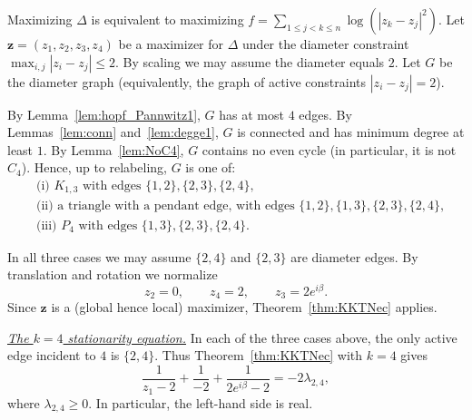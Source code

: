 \documentclass{article}
\theoremstyle{definition}
\let\le\leqslant
\let\ge\geqslant
\begin{document}
Maximizing \(\Delta\) is equivalent to maximizing \(f= \sum_{1 \le j < k \le n} \log ( |z_k - z_j|^2 )\). Let \(\mathbf z=(z_1,z_2,z_3,z_4)\) be a maximizer for \(\Delta\) under the diameter constraint \(\max_{i,j}|z_i-z_j|\le 2\). By scaling we may assume the diameter equals \(2\). Let \(G\) be the diameter graph (equivalently, the graph of active constraints \(|z_i-z_j|=2\)).

By Lemma~\ref{lem:hopf_Pannwitz1}, \(G\) has at most \(4\) edges.
By Lemmas~\ref{lem:conn} and~\ref{lem:degge1}, \(G\) is connected and has minimum degree at least \(1\).
By Lemma~\ref{lem:NoC4}, \(G\) contains no even cycle (in particular, it is not \(C_4\)).
Hence, up to relabeling, \(G\) is one of:
\begin{align*}
&\text{(i) }K_{1,3} \text{ with edges } \{1,2\},\{2,3\},\{2,4\},\\
&\text{(ii) a triangle with a pendant edge, with edges } \{1,2\},\{1,3\},\{2,3\},\{2,4\},\\
&\text{(iii) }P_4 \text{ with edges } \{1,3\},\{2,3\},\{2,4\}.
\end{align*}

In all three cases we may assume \(\{2,4\}\) and \(\{2,3\}\) are diameter edges.
By translation and rotation we normalize
\[
z_2=0,\qquad z_4=2,\qquad z_3=2e^{i\beta}.
\]
Since \(\mathbf z\) is a (global hence local) maximizer, Theorem~\ref{thm:KKTNec} applies.

\smallskip
\noindent\underline{\emph{The \(k=4\) stationarity equation.}}
In each of the three cases above, the only active edge incident to \(4\) is \(\{2,4\}\). Thus Theorem~\ref{thm:KKTNec} with \(k=4\) gives
\begin{equation}\label{eq:k4}
\frac1{z_1-2}+\frac1{-2}+\frac1{2e^{i\beta}-2}=-2\lambda_{2,4},
\end{equation}
where \(\lambda_{2,4}\ge 0\).
In particular, the left-hand side is real.
\end{document}
